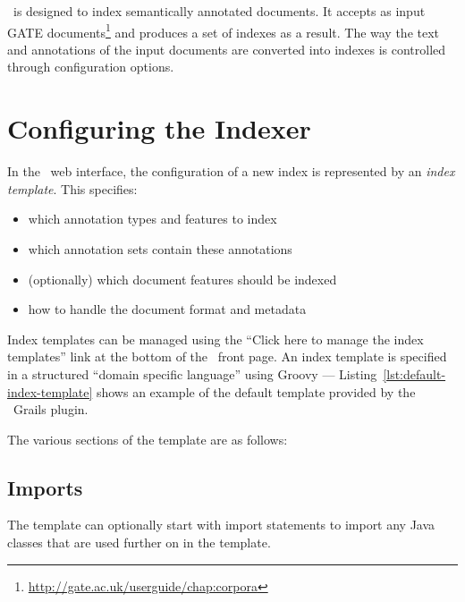 \Mimir\ is designed to index semantically annotated documents. It accepts as
input GATE documents\footnote{\url{http://gate.ac.uk/userguide/chap:corpora}}
and produces a set of indexes as a result. The way the text and annotations of
the input documents are converted into indexes is controlled through
configuration options.

\section{Configuring the Indexer}\label{sec:indexing:templates}

In the \Mimir\ web interface, the configuration of a new index is represented
by an {\em index template}.  This specifies:
\begin{itemize}
\item which annotation types and features to index
\item which annotation sets contain these annotations
\item (optionally) which document features should be indexed
\item how to handle the document format and metadata
\end{itemize}

Index templates can be managed using the ``Click here to manage the index
templates'' link at the bottom of the \Mimir\ front page.  An index template is
specified in a structured ``domain specific language'' using Groovy ---
Listing~\ref{lst:default-index-template} shows an example of the default
template provided by the \Mimir\ Grails plugin.
%
%
\newcommand{\defaultIndexTemplate}[1][]{{%
}}%
%
\defaultIndexTemplate[float=htb,%
    caption={The default index template provided with \Mimir},%
    label=lst:default-index-template,%
]

{\newpage}
The various sections of the template are as follows:

\subsection*{Imports}
\defaultIndexTemplate[linerange=1-5,firstnumber=1]

The template can optionally start with import statements to import any Java
classes that are used further on in the template.

